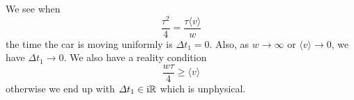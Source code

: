 \begin{soln}
\EVALUATE
We see when
\begin{equation}
\frac{\tau^{2}}{4}=\frac{\tau\langle v\rangle}{w}
\end{equation}
the time the car is moving uniformly is $\Delta t_{1}=0$.
Also, as $w\to\infty$ or $\langle v\rangle\to0$, we have $\Delta t_{1}\to 0$. We also have a reality condition
\begin{equation}
\frac{w\tau}{4}\geq\langle v\rangle
\end{equation}
otherwise we end up with $\varDelta t_{1}\in\mathrm{i}\mathbb{R}$ which is unphysical.
\end{soln}